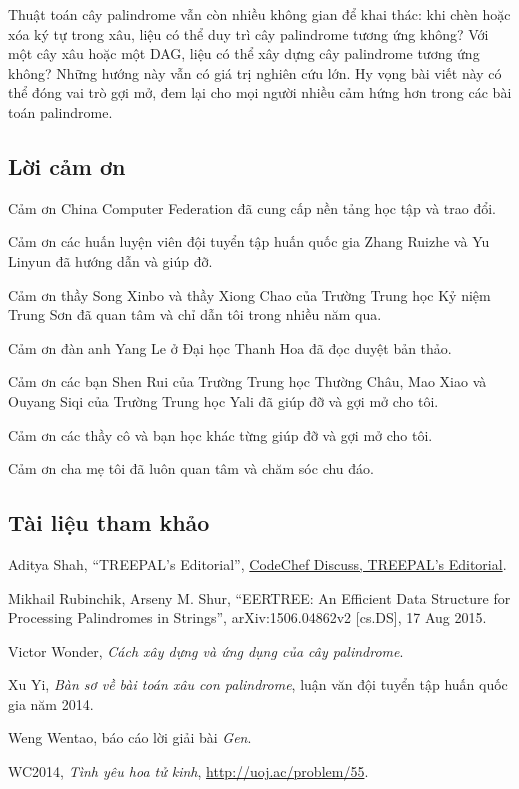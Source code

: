 \documentclass[11pt]{article}
\begin{document}
Thuật toán cây palindrome vẫn còn nhiều không gian để khai thác: khi chèn hoặc
xóa ký tự trong xâu, liệu có thể duy trì cây palindrome tương ứng không? Với
một cây xâu hoặc một DAG, liệu có thể xây dựng cây palindrome tương ứng không?
Những hướng này vẫn có giá trị nghiên cứu lớn. Hy vọng bài viết này có thể
đóng vai trò gợi mở, đem lại cho mọi người nhiều cảm hứng hơn trong các bài
toán palindrome.

\subsection{Lời cảm ơn}

Cảm ơn China Computer Federation đã cung cấp nền tảng học tập và trao đổi.

Cảm ơn các huấn luyện viên đội tuyển tập huấn quốc gia Zhang Ruizhe và Yu
Linyun đã hướng dẫn và giúp đỡ.

Cảm ơn thầy Song Xinbo và thầy Xiong Chao của Trường Trung học Kỷ niệm Trung
Sơn đã quan tâm và chỉ dẫn tôi trong nhiều năm qua.

Cảm ơn đàn anh Yang Le ở Đại học Thanh Hoa đã đọc duyệt bản thảo.

Cảm ơn các bạn Shen Rui của Trường Trung học Thường Châu, Mao Xiao và Ouyang
Siqi của Trường Trung học Yali đã giúp đỡ và gợi mở cho tôi.

Cảm ơn các thầy cô và bạn học khác từng giúp đỡ và gợi mở cho tôi.

Cảm ơn cha mẹ tôi đã luôn quan tâm và chăm sóc chu đáo.

\subsection*{Tài liệu tham khảo}

\begin{enumerate}[label={[\arabic*]}]
  \item Aditya Shah, ``TREEPAL's Editorial'',
  \href{https://discuss.codechef.com/questions/85636/treepal-editorial}{CodeChef
  Discuss, TREEPAL's Editorial}.

  \item Mikhail Rubinchik, Arseny M. Shur, ``EERTREE: An Efficient Data
  Structure for Processing Palindromes in Strings'', arXiv:1506.04862v2
  [cs.DS], 17 Aug 2015.

  \item Victor Wonder, \emph{Cách xây dựng và ứng dụng của cây palindrome}.

  \item Xu Yi, \emph{Bàn sơ về bài toán xâu con palindrome}, luận văn đội
  tuyển tập huấn quốc gia năm 2014.

  \item Weng Wentao, báo cáo lời giải bài \emph{Gen}.

  \item WC2014, \emph{Tình yêu hoa tử kinh}, \url{http://uoj.ac/problem/55}.
\end{enumerate}
\end{document}
